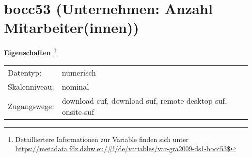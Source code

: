 
    \setcounter{footnote}{0}

    \vspace*{-1.8cm}
	\section{bocc53 (Unternehmen: Anzahl Mitarbeiter(innen))}
	\label{section:bocc53}



    \vspace*{0.5cm}
    \noindent\textbf{Eigenschaften
	\footnote{Detailliertere Informationen zur Variable finden sich unter
		\url{https://metadata.fdz.dzhw.eu/\#!/de/variables/var-gra2009-ds1-bocc53$}}}\\
	\begin{tabularx}{\hsize}{@{}lX}
	Datentyp: & numerisch \\
	Skalenniveau: & nominal \\
	Zugangswege: &
	  download-cuf, 
	  download-suf, 
	  remote-desktop-suf, 
	  onsite-suf
 \\
    \end{tabularx}



